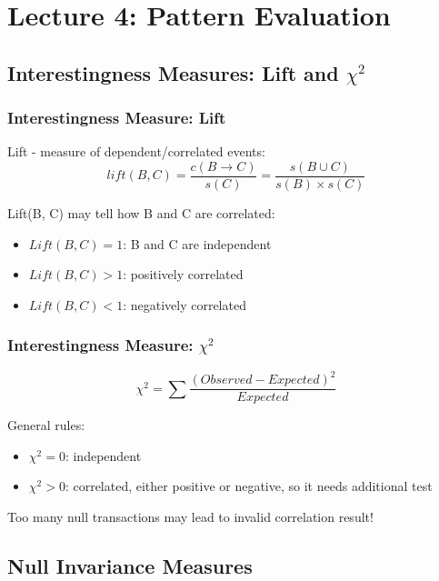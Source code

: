 \section{Lecture 4: Pattern Evaluation}

\subsection{Interestingness Measures: Lift and $\chi ^2$}

\subsubsection{Interestingness Measure: Lift}

Lift - measure of dependent/correlated events:
\begin{equation*}
lift(B,C) = \frac{c(B \to C)}{s(C)} = \frac{s(B \cup C)}{s(B) \times s(C)}
\end{equation*}

Lift(B, C) may tell how B and C are correlated:
\begin{itemize}
\item $Lift(B, C) = 1$: B and C are independent
\item $Lift(B, C) > 1$: positively correlated
\item $Lift(B, C) < 1$: negatively correlated
\end{itemize}

\subsubsection{Interestingness Measure: $\chi ^2$}
\begin{equation*}
\chi^2=\sum\frac{(Observed-Expected)^2}{Expected}
\end{equation*}

General rules:
\begin{itemize}
\item $\chi^2 = 0$: independent
\item $\chi^2 > 0$: correlated, either positive or negative, so it needs additional test
\end{itemize}

Too many null transactions may lead to invalid correlation result!

\subsection{Null Invariance Measures}

